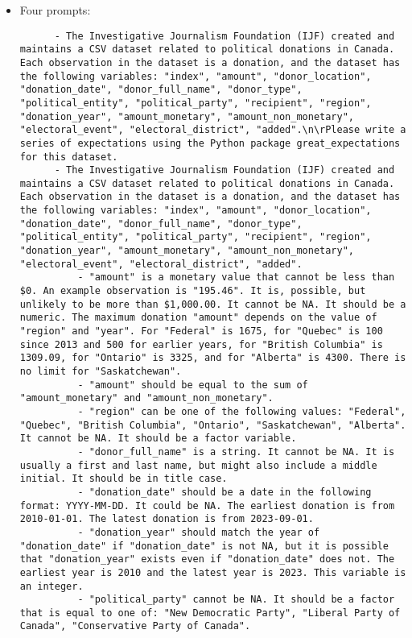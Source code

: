 \documentclass[
  letterpaper,
  DIV=11,
  numbers=noendperiod]{scrartcl}
\providecommand{\tightlist}{%
  \setlength{\itemsep}{0pt}\setlength{\parskip}{0pt}}\usepackage{longtable,booktabs,array}
\begin{document}
\begin{itemize}
\tightlist
\item
  Four prompts:

  \begin{lstlisting}
      - The Investigative Journalism Foundation (IJF) created and maintains a CSV dataset related to political donations in Canada. Each observation in the dataset is a donation, and the dataset has the following variables: "index", "amount", "donor_location", "donation_date", "donor_full_name", "donor_type", "political_entity", "political_party", "recipient", "region", "donation_year", "amount_monetary", "amount_non_monetary", "electoral_event", "electoral_district", "added".\n\rPlease write a series of expectations using the Python package great_expectations for this dataset.
      - The Investigative Journalism Foundation (IJF) created and maintains a CSV dataset related to political donations in Canada. Each observation in the dataset is a donation, and the dataset has the following variables: "index", "amount", "donor_location", "donation_date", "donor_full_name", "donor_type", "political_entity", "political_party", "recipient", "region", "donation_year", "amount_monetary", "amount_non_monetary", "electoral_event", "electoral_district", "added". 
          - "amount" is a monetary value that cannot be less than $0. An example observation is "195.46". It is, possible, but unlikely to be more than $1,000.00. It cannot be NA. It should be a numeric. The maximum donation "amount" depends on the value of "region" and "year". For "Federal" is 1675, for "Quebec" is 100 since 2013 and 500 for earlier years, for "British Columbia" is 1309.09, for "Ontario" is 3325, and for "Alberta" is 4300. There is no limit for "Saskatchewan".
          - "amount" should be equal to the sum of "amount_monetary" and "amount_non_monetary".
          - "region" can be one of the following values: "Federal", "Quebec", "British Columbia", "Ontario", "Saskatchewan", "Alberta". It cannot be NA. It should be a factor variable.
          - "donor_full_name" is a string. It cannot be NA. It is usually a first and last name, but might also include a middle initial. It should be in title case.
          - "donation_date" should be a date in the following format: YYYY-MM-DD. It could be NA. The earliest donation is from 2010-01-01. The latest donation is from 2023-09-01.
          - "donation_year" should match the year of "donation_date" if "donation_date" is not NA, but it is possible that "donation_year" exists even if "donation_date" does not. The earliest year is 2010 and the latest year is 2023. This variable is an integer.
          - "political_party" cannot be NA. It should be a factor that is equal to one of: "New Democratic Party", "Liberal Party of Canada", "Conservative Party of Canada".


\end{lstlisting}
\end{itemize}
\end{document}
